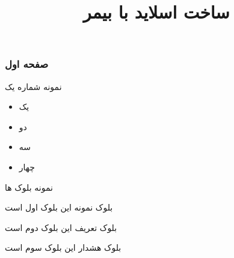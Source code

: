 \documentclass[12pt]{beamer}
\author{}
\title[آموزش لاتک]{\raggedleft ساخت اسلاید با بیمر}
\begin{document}
\frame{\maketitle}
\begin{frame}\raggedleft
\frametitle{صفحه اول}
نمونه شماره یک

    \begin{multicols}{2}
    \begin{itemize}\raggedleft
        \item یک
        \item دو
        \item سه
        \item چهار
    \end{itemize}
    \end{multicols}
\end{frame}

\begin{frame}[t]{نمونه بلوک ها}

    \begin{exampleblock}{بلوک نمونه}
        این بلوک اول است
    \end{exampleblock}

    \begin{theorem}{بلوک تعریف}
        این بلوک دوم است
    \end{theorem}

    \begin{alertblock}{بلوک هشدار}
        این بلوک سوم است
    \end{alertblock}
    
\end{frame}
\end{document}
